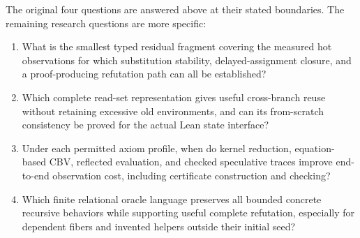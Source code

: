 The original four questions are answered above at their stated boundaries.
The remaining research questions are more specific:
\begin{enumerate}[label=R3.N\arabic*.]
\item What is the smallest typed residual fragment covering the measured hot
observations for which substitution stability, delayed-assignment closure,
and a proof-producing refutation path can all be established?
\item Which complete read-set representation gives useful cross-branch reuse
without retaining excessive old environments, and can its from-scratch
consistency be proved for the actual Lean state interface?
\item Under each permitted axiom profile, when do kernel reduction, equation-
based CBV, reflected evaluation, and checked speculative traces improve
end-to-end observation cost, including certificate construction and checking?
\item Which finite relational oracle language preserves all bounded concrete
recursive behaviors while supporting useful complete refutation, especially
for dependent fibers and invented helpers outside their initial seed?
\end{enumerate}
